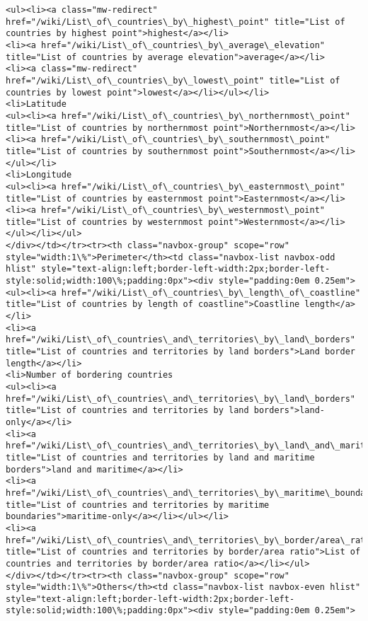 \documentclass[11pt]{article}
\begin{document}
\begin{Verbatim}[commandchars=\\\{\}]
<ul><li><a class="mw-redirect" href="/wiki/List\_of\_countries\_by\_highest\_point" title="List of countries by highest point">highest</a></li>
<li><a href="/wiki/List\_of\_countries\_by\_average\_elevation" title="List of countries by average elevation">average</a></li>
<li><a class="mw-redirect" href="/wiki/List\_of\_countries\_by\_lowest\_point" title="List of countries by lowest point">lowest</a></li></ul></li>
<li>Latitude
<ul><li><a href="/wiki/List\_of\_countries\_by\_northernmost\_point" title="List of countries by northernmost point">Northernmost</a></li>
<li><a href="/wiki/List\_of\_countries\_by\_southernmost\_point" title="List of countries by southernmost point">Southernmost</a></li></ul></li>
<li>Longitude
<ul><li><a href="/wiki/List\_of\_countries\_by\_easternmost\_point" title="List of countries by easternmost point">Easternmost</a></li>
<li><a href="/wiki/List\_of\_countries\_by\_westernmost\_point" title="List of countries by westernmost point">Westernmost</a></li></ul></li></ul>
</div></td></tr><tr><th class="navbox-group" scope="row" style="width:1\%">Perimeter</th><td class="navbox-list navbox-odd hlist" style="text-align:left;border-left-width:2px;border-left-style:solid;width:100\%;padding:0px"><div style="padding:0em 0.25em">
<ul><li><a href="/wiki/List\_of\_countries\_by\_length\_of\_coastline" title="List of countries by length of coastline">Coastline length</a></li>
<li><a href="/wiki/List\_of\_countries\_and\_territories\_by\_land\_borders" title="List of countries and territories by land borders">Land border length</a></li>
<li>Number of bordering countries
<ul><li><a href="/wiki/List\_of\_countries\_and\_territories\_by\_land\_borders" title="List of countries and territories by land borders">land-only</a></li>
<li><a href="/wiki/List\_of\_countries\_and\_territories\_by\_land\_and\_maritime\_borders" title="List of countries and territories by land and maritime borders">land and maritime</a></li>
<li><a href="/wiki/List\_of\_countries\_and\_territories\_by\_maritime\_boundaries" title="List of countries and territories by maritime boundaries">maritime-only</a></li></ul></li>
<li><a href="/wiki/List\_of\_countries\_and\_territories\_by\_border/area\_ratio" title="List of countries and territories by border/area ratio">List of countries and territories by border/area ratio</a></li></ul>
</div></td></tr><tr><th class="navbox-group" scope="row" style="width:1\%">Others</th><td class="navbox-list navbox-even hlist" style="text-align:left;border-left-width:2px;border-left-style:solid;width:100\%;padding:0px"><div style="padding:0em 0.25em">

\end{Verbatim}
\end{document}
